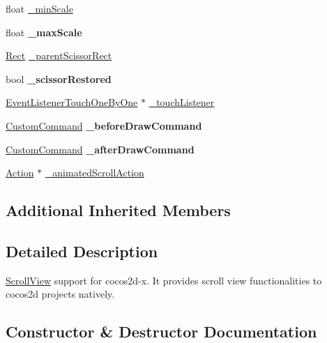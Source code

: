 \begin{DoxyCompactItemize}
\item 
float \hyperlink{classScrollView_a65c741ae285cb6769864913876512bd6}{\+\_\+min\+Scale}
\item 
\mbox{\label{classScrollView_a3fdc07a5c51ee632ec1e4ade16a04df2}} 
float {\bfseries \+\_\+max\+Scale}
\item 
\hyperlink{classRect}{Rect} \hyperlink{classScrollView_a0d99cf5b2372a67ca4ad18257beef46c}{\+\_\+parent\+Scissor\+Rect}
\item 
\mbox{\label{classScrollView_ab82a1ca0d6b2cabb48ed5d53d472f21e}} 
bool {\bfseries \+\_\+scissor\+Restored}
\item 
\hyperlink{classEventListenerTouchOneByOne}{Event\+Listener\+Touch\+One\+By\+One} $\ast$ \hyperlink{classScrollView_a5265050c036f42b2144a7d5cc737b387}{\+\_\+touch\+Listener}
\item 
\mbox{\label{classScrollView_a6f1c4128b9d59f087b140a1ff5058c99}} 
\hyperlink{classCustomCommand}{Custom\+Command} {\bfseries \+\_\+before\+Draw\+Command}
\item 
\mbox{\label{classScrollView_a7f207159e11b9c53eb6991603fc4f13c}} 
\hyperlink{classCustomCommand}{Custom\+Command} {\bfseries \+\_\+after\+Draw\+Command}
\item 
\hyperlink{classAction}{Action} $\ast$ \hyperlink{classScrollView_a42ddc8c9146791b538cd9dbd102a2b1d}{\+\_\+animated\+Scroll\+Action}
\end{DoxyCompactItemize}
\subsection*{Additional Inherited Members}


\subsection{Detailed Description}
\hyperlink{classScrollView}{Scroll\+View} support for cocos2d-\/x. It provides scroll view functionalities to cocos2d projects natively. 

\subsection{Constructor \& Destructor Documentation}
\mbox{\label{classScrollView_afe9273a62ee4829f87d13a22e0576ac7}} 
